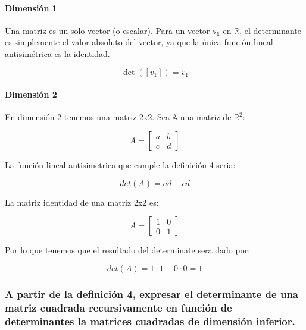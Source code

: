 \documentclass[11pt]{article}
\begin{document}
\paragraph{Dimensión 1}\label{dimensiuxf3n-1}

Una matriz es un solo vector (o escalar). Para un vector
\(\mathbb{v_1}\) en \(\mathbb{R}\), el determinante es simplemente el
valor absoluto del vector, ya que la única función lineal antisimétrica
es la identidad.

\begin{equation}
\det([v_1]) = v_1
\end{equation}

\paragraph{Dimensión 2}\label{dimensiuxf3n-2}

En dimensión 2 tenemos una matriz 2x2. Sea \(\mathbb{A}\) una matriz de
\(\mathbb{R}^2\):

\begin{equation}
A =
\begin{bmatrix}
a & b \\
c & d
\end{bmatrix}
\end{equation}

La función lineal antisimetrica que cumple la definición 4 seria:

\begin{equation}
det(A) =ad-cd
\end{equation}

La matriz identidad de una matriz 2x2 es:

\begin{equation}
A =
\begin{bmatrix}
1 & 0 \\
0 & 1
\end{bmatrix}
\end{equation}

Por lo que tenemos que el resultado del determinate sera dado por:

\begin{equation}
det(A) = 1 \cdot 1-0 \cdot 0 = 1
\end{equation}

    \subsubsection{A partir de la definición 4, expresar el determinante de
una matriz cuadrada recursivamente en función de determinantes la
matrices cuadradas de dimensión
inferior.}\label{a-partir-de-la-definiciuxf3n-4-expresar-el-determinante-de-una-matriz-cuadrada-recursivamente-en-funciuxf3n-de-determinantes-la-matrices-cuadradas-de-dimensiuxf3n-inferior.}
\end{document}

